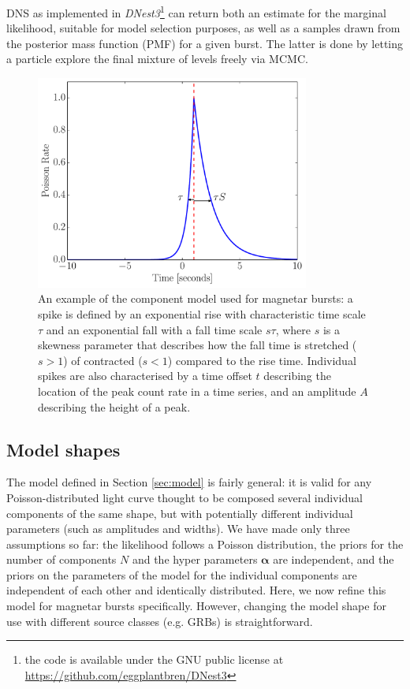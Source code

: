 \documentclass[12pt]{emulateapj}
\begin{document}
DNS as implemented in {\it DNest3}\footnote{the code is available under the GNU public license at \hyperref[]{https://github.com/eggplantbren/DNest3}} can return both an estimate for the marginal likelihood,
suitable for model selection purposes, as well as a samples drawn from the posterior mass function (PMF) for a given burst. The latter is done by letting a particle explore
the final mixture of levels freely via MCMC. 
\begin{figure}[h]
\begin{center}
\includegraphics[width=9cm]{word.pdf}
\caption{An example of the component model used for magnetar bursts: a spike is defined by an exponential rise with characteristic
time scale $\tau$ and an exponential fall with a fall time scale $s\tau$, where $s$ is a skewness parameter that describes how the fall
time is stretched ($s > 1$) of contracted ($s < 1$) compared to the rise time. Individual spikes are also characterised by a time offset
$t$ describing the location of the peak count rate in a time series, and an amplitude $A$ describing the height of a peak.}
\label{fig:word_example}
\end{center}
\end{figure}
\subsection{Model shapes}
\label{sec:wordmodel}




The model defined in Section \ref{sec:model} is fairly general: it is valid for any Poisson-distributed light curve thought to be composed several individual components of
the same shape, but with potentially different individual parameters (such as amplitudes and widths). 
We have made only three assumptions so far: the likelihood follows a Poisson distribution, the priors for the number of components $N$ and the hyper parameters $\bm{\alpha}$ are independent,
and the priors on the parameters of the model for the individual components are independent of each other and identically distributed. 
Here, we now refine this model for magnetar bursts specifically. However, changing the model shape for use with different source classes (e.g. GRBs) is straightforward.
\end{document}
